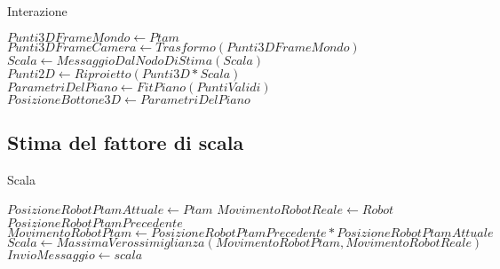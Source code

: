 \begin{algorithm}
  \caption{Interazione}\label{alg:Interazione}
  \begin{algorithmic}[1]
    \State $Punti3DFrameMondo \gets Ptam$
    \State $Punti3DFrameCamera \gets Trasformo(Punti3DFrameMondo)$
    \State $Scala \gets MessaggioDalNodoDiStima(Scala)$
     \State $Punti2D \gets Riproietto(Punti3D*Scala)$
      
      
     \State $ParametriDelPiano \gets FitPiano(PuntiValidi)$
     \State $PosizioneBottone3D \gets ParametriDelPiano$
        \Else 
      \EndIf
      \Else 
    \EndIf
  \end{algorithmic}
\end{algorithm}


\subsection{Stima del fattore di scala}

\begin{algorithm}
  \caption{Scala}\label{alg:scala}
  \begin{algorithmic}[1]
    \State $PosizioneRobotPtamAttuale \gets Ptam$
    \State $MovimentoRobotReale \gets Robot$
    \State $PosizioneRobotPtamPrecedente $
    \State $MovimentoRobotPtam \gets PosizioneRobotPtamPrecedente*PosizioneRobotPtamAttuale$
      
    \State $Scala \gets MassimaVerossimiglianza(MovimentoRobotPtam, MovimentoRobotReale)$
        \State $InvioMessaggio \gets scala$
     \Else 

    \EndIf
  \end{algorithmic}
\end{algorithm}
